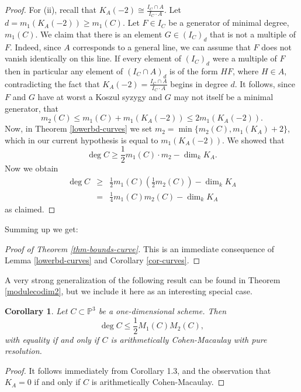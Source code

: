 \documentclass[12pt,twoside]{amsart}
\numberwithin{equation}{section}
\newtheorem{corollary}[theorem]{Corollary}
\theoremstyle{definition}
\begin{document}
\begin{proof}
For (ii), recall that $K_A(-2) \cong \frac{I_C \cap A}{I_C \cdot A}$.  Let $d =
m_1(K_A(-2)) \geq m_1(C)$.  Let $F \in I_C$ be a generator of minimal degree,
$m_1(C)$.  We claim that there is an element $G \in (I_C)_d$ that is not a
multiple of $F$.  Indeed, since $A$ corresponds to a general line, we can assume
that $F$ does not vanish identically on this line.  If every element of
$(I_C)_d$ were a multiple of $F$ then in particular any element of $(I_C \cap
A)_d$ is of the form $HF$, where $H \in A$, contradicting the fact that $K_A(-2)
= \frac{I_C \cap A}{I_C \cdot A}$ begins in degree $d$.  It follows, since $F$
and $G$ have at worst a Koszul syzygy and $G$ may not itself be a minimal
generator, that
\[
m_2(C) \leq m_1(C) + m_1(K_A(-2)) \leq 2 m_1(K_A(-2)).
\]
Now, in Theorem \ref{lowerbd-curves} we set $m_2 = \min\{m_2(C), m_1(K_A) +2
\}$, which in our current hypothesis is equal to $m_1(K_A(-2))$.  We showed
that
\[
\deg C \geq \frac{1}{2} m_1 (C) \cdot m_2 - \dim_k K_A.
\]
Now we obtain
\[
\begin{array}{rcl}
\deg C & \geq & \displaystyle \frac{1}{2} m_1(C) \left ( \frac{1}{2}
m_2(C)  \right ) - \dim_k K_A \\
& = & \displaystyle \frac{1}{4} m_1(C) m_2(C) - \dim_k K_A
\end{array}
\]
as claimed.
\end{proof}

Summing up we get:

\begin{proof}[Proof of Theorem \ref{thm-bounds-curve}]
This is an immediate consequence of Lemma \ref{lowerbd-curves} and Corollary
\ref{cor-curves}.
\end{proof}

A very strong generalization of the following result can be found in Theorem
\ref{modulecodim2}, but  we include it here as an interesting special case.

\begin{corollary}
Let $C \subset {\mathbb P}^3$ be a one-dimensional scheme.  Then
\[
\deg C \leq \frac{1}{2} M_1(C)M_2(C),
\]
with equality if and only if $C$ is arithmetically Cohen-Macaulay with pure resolution.
\end{corollary}

\begin{proof}
It follows immediately from \cite{MNR} Corollary 1.3, and the observation that $K_A = 0$ if and only if $C$ is arithmetically Cohen-Macaulay.
\end{proof}
\end{document}
